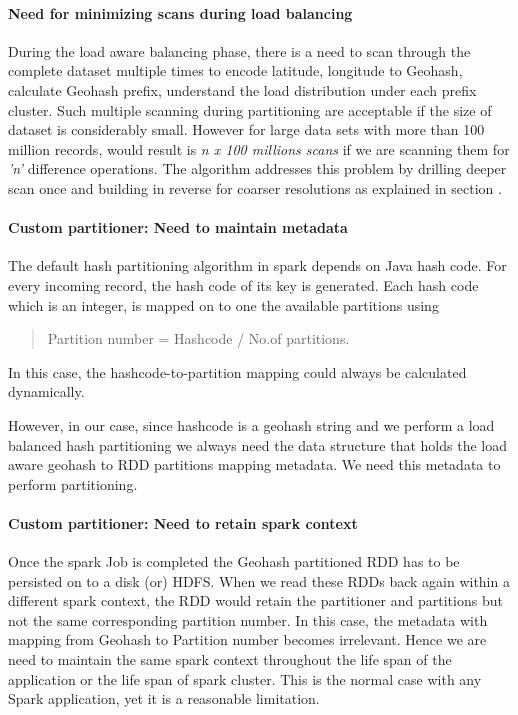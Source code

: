 \documentclass[article,type=msc,colorback,12pt,accentcolor=tud1d]{tudthesis}
\begin{document}
		  \paragraph{Need for minimizing scans during load balancing}
			  During the load aware balancing phase, there is a need to scan through the complete dataset multiple times to encode latitude, longitude to Geohash, calculate Geohash prefix, understand the load distribution under each prefix cluster. Such multiple scanning during partitioning are acceptable if the size of dataset is considerably small. However for large data sets with more than 100 million records, would result is \textit{n x 100 millions scans} if we are scanning them for \textit{'n'} difference operations. The algorithm addresses this problem by drilling deeper scan once and building in reverse for coarser resolutions as explained in section \pageref{fig:loadlevels}. 
			  
		 \paragraph{Custom partitioner: Need to maintain metadata}
		  \par The default hash partitioning algorithm in spark depends on Java hash code. For every incoming record, the hash code of its key is generated. Each hash code which is an integer, is mapped on to one the available partitions using 
				\begin{center}
					  \begin{quote}
				  	Partition number = Hashcode / No.of partitions. 
				  \end{quote}
				\end{center}
		  In this case, the hashcode-to-partition mapping could always be calculated dynamically.
		  
		  However, in our case, since hashcode is a geohash string and we perform a load balanced hash partitioning we always need the data structure that holds the load aware geohash to RDD partitions mapping metadata. We need this metadata to perform partitioning. 
		  
		  \paragraph{Custom partitioner: Need to retain spark context}
		  Once the spark Job is completed the Geohash partitioned RDD has to be persisted on to a disk (or) HDFS. When we read these RDDs back again within a different spark context, the RDD would retain the partitioner and partitions but not the same corresponding partition number. In this case, the metadata with mapping from Geohash to Partition number becomes irrelevant. Hence we are need to maintain the same spark context throughout the life span of the application or the life span of spark cluster. This is the normal case with any Spark application, yet it is a reasonable limitation.
		  
\end{document}
